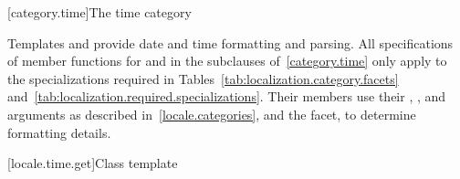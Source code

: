 [category.time]{The time category}

\pnum
Templates
and
provide date and time formatting and parsing.
All specifications of member functions for
and
in the subclauses of~\ref{category.time} only apply to the
specializations required in Tables~\ref{tab:localization.category.facets}
and~\ref{tab:localization.required.specializations}.
Their members use their
,
,
and
arguments as described in~\ref{locale.categories}, and the
facet, to determine formatting details.

[locale.time.get]{Class template }

%
